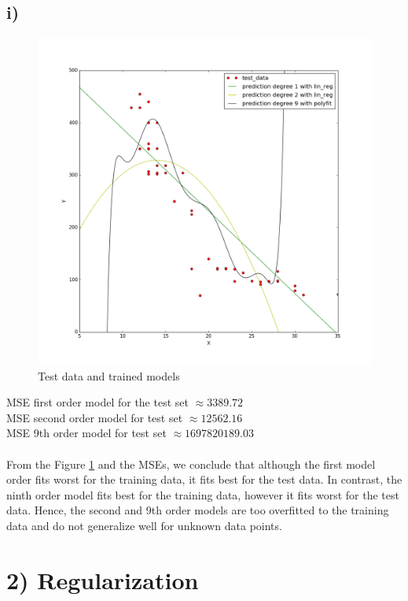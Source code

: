 \documentclass{article}
\begin{document}
\subsection*{i)}
\begin{figure}[H]
	\centering
	\includegraphics[scale=0.25]{31i.png}
	\caption{Test data and trained models}
	\label{fig8}
\end{figure}
MSE first order model for the test set $\approx 3389.72$\\
MSE second order model for test set $\approx 12562.16$\\
MSE 9th order model for test set $\approx 1697820189.03$\\
\\
From the Figure \ref{fig8} and the MSEs, we conclude that although the first model order fits worst for the training data, it fits best for the test data. In contrast, the ninth order model fits best for the training data, however it fits worst for the test data. Hence, the second and 9th order models are too overfitted to the training data and do not generalize well for unknown data points.
\section*{2) Regularization}
\end{document}
